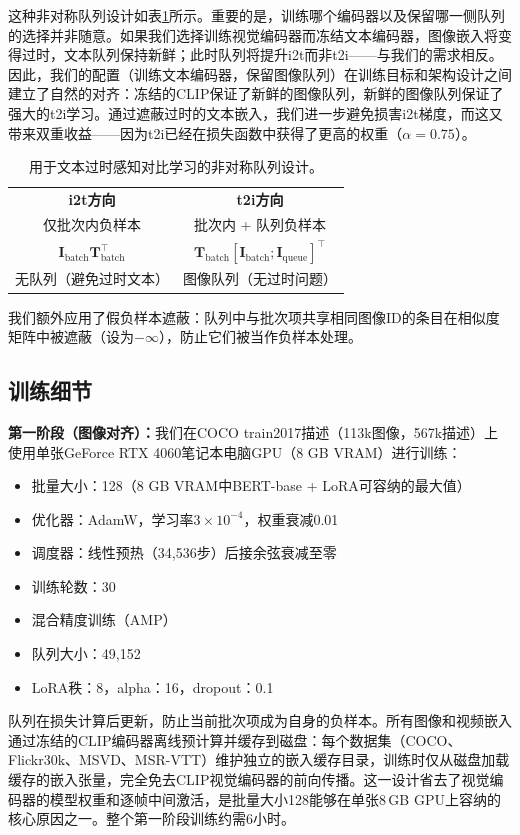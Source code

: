 \documentclass[10pt,a4paper]{ctexart}
\begin{document}
这种非对称队列设计如表\ref{tab:queue}所示。重要的是，训练哪个编码器以及保留哪一侧队列的选择并非随意。如果我们选择训练视觉编码器而冻结文本编码器，图像嵌入将变得过时，文本队列保持新鲜；此时队列将提升i2t而非t2i——与我们的需求相反。因此，我们的配置（训练文本编码器，保留图像队列）在训练目标和架构设计之间建立了自然的对齐：冻结的CLIP保证了新鲜的图像队列，新鲜的图像队列保证了强大的t2i学习。通过遮蔽过时的文本嵌入，我们进一步避免损害i2t梯度，而这又带来双重收益——因为t2i已经在损失函数中获得了更高的权重（$\alpha = 0.75$）。

\begin{table}[htbp]
\centering
\caption{用于文本过时感知对比学习的非对称队列设计。}
\label{tab:queue}
\begin{tabular}{c|c}
\hline
\textbf{i2t方向} & \textbf{t2i方向} \\
仅批次内负样本 & 批次内 + 队列负样本 \\
\hline
$\mathbf{I}_{\text{batch}} \mathbf{T}_{\text{batch}}^{\top}$ & $\mathbf{T}_{\text{batch}} [\mathbf{I}_{\text{batch}}; \mathbf{I}_{\text{queue}}]^{\top}$ \\
无队列（避免过时文本） & 图像队列（无过时问题） \\
\hline
\end{tabular}
\end{table}

我们额外应用了假负样本遮蔽：队列中与批次项共享相同图像ID的条目在相似度矩阵中被遮蔽（设为$-\infty$），防止它们被当作负样本处理。

\subsection{训练细节}

\textbf{第一阶段（图像对齐）：}我们在COCO train2017描述（113k图像，567k描述）上使用单张GeForce RTX 4060笔记本电脑GPU（8 GB VRAM）进行训练：
\begin{itemize}
  \item 批量大小：128（8 GB VRAM中BERT-base + LoRA可容纳的最大值）
  \item 优化器：AdamW，学习率$3\times 10^{-4}$，权重衰减0.01
  \item 调度器：线性预热（34,536步）后接余弦衰减至零
  \item 训练轮数：30
  \item 混合精度训练（AMP）
  \item 队列大小：49,152
  \item LoRA秩：8，alpha：16，dropout：0.1
\end{itemize}
队列在损失计算后更新，防止当前批次项成为自身的负样本。所有图像和视频嵌入通过冻结的CLIP编码器离线预计算并缓存到磁盘：每个数据集（COCO、Flickr30k、MSVD、MSR-VTT）维护独立的嵌入缓存目录，训练时仅从磁盘加载缓存的嵌入张量，完全免去CLIP视觉编码器的前向传播。这一设计省去了视觉编码器的模型权重和逐帧中间激活，是批量大小128能够在单张8\,GB GPU上容纳的核心原因之一。整个第一阶段训练约需6小时。
\end{document}

